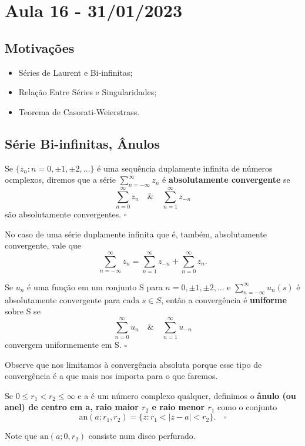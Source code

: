 \documentclass[complex.tex]{subfiles}
\begin{document}
\section{Aula 16 - 31/01/2023}
\subsection{Motivações}
\begin{itemize}
	\item Séries de Laurent e Bi-infinitas;
	\item Relação Entre Séries e Singularidades;
	\item Teorema de Casorati-Weierstrass.
\end{itemize}
\subsection{Série Bi-infinitas, Ânulos}
\begin{def*}
	Se \(\{z_{n}:n = 0, \pm1, \pm2, \dotsc \}\) é uma sequência duplamente infinita de números ocmplexos, diremos
	que a série \(\sum\limits_{n=-\infty}^{\infty}z_{n}\) é \textbf{absolutamente convergente} se
	\[
		\sum\limits_{n=0}^{\infty}z_{n}\quad\&\quad \sum\limits_{n=1}^{\infty}z_{-n}
	\]
	são absolutamente convergentes. \(\square\)
\end{def*}
No caso de uma série duplamente infinita que é, também, absolutamente convergente, vale que
\[
	\sum\limits_{n=-\infty}^{\infty}z_{n} = \sum\limits_{n=1}^{\infty}z_{-n} + \sum\limits_{n=0}^{\infty}z_{n}.
\]
\begin{def*}
	Se \(u_{n}\) é uma função em um conjunto S para \(n=0, \pm1, \pm2, \dotsc \) e \( \sum\limits_{n=-\infty}^{\infty}u_{n}(s)\) é absolutamente convergente
	para cada \(s\in S\), então a convergência é \textbf{uniforme} sobre S se
	\[
		\sum\limits_{n=0}^{\infty}u_{n}\quad\&\quad \sum\limits_{n=1}^{\infty}u_{-n}
	\]
	convergem uniformemente em S. \(\square\)
\end{def*}
Observe que nos limitamos à convergência absoluta porque esse tipo de convergência é a que mais nos importa
para o que faremos.
\begin{def*}
	Se \(0\leq r_{1}<r_{2}\leq \infty\) e a é um número complexo qualquer, definimos
	o \textbf{ânulo (ou anel) de centro em a, raio maior \(r_{2}\) e raio menor \(r_{1}\)} como o conjunto
	\[
		\mathrm{an}(a; r_{1}, r_{2}) = \{z: r_{1} < |z-a| < r_{2}\}.\quad \square
	\]
\end{def*}
Note que \(\mathrm{an}(a; 0, r_{2})\) consiste num disco perfurado.
\end{document}
